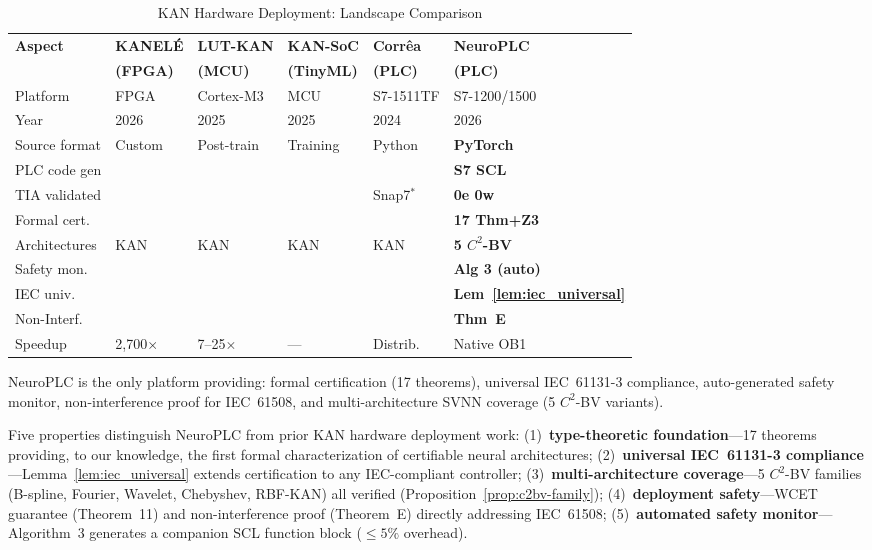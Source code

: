 \documentclass[journal,onecolumn]{IEEEtran}
\newcommand{\neuroplc}{NeuroPLC\xspace}
\newcommand{\xmark}{\ding{55}}
\begin{document}
\begin{table}[tb]
\centering
\caption{KAN Hardware Deployment: Landscape Comparison}
\label{tab:kan_deployment}
\footnotesize
\begin{tabular}{@{}p{1.5cm}p{1.2cm}p{1.2cm}p{1.2cm}p{1.3cm}p{1.4cm}@{}}
\toprule
\textbf{Aspect} & \textbf{KANEL\'{E}} & \textbf{LUT-KAN} & \textbf{KAN-SoC} & \textbf{Corr\^ea} & \textbf{NeuroPLC} \\
 & \textbf{(FPGA)} & \textbf{(MCU)} & \textbf{(TinyML)} & \textbf{(PLC)} & \textbf{(PLC)} \\
\midrule
Platform & FPGA & Cortex-M3 & MCU & S7-1511TF & S7-1200/1500 \\
Year & 2026 & 2025 & 2025 & 2024 & 2026 \\
\midrule
Source format & Custom & Post-train & Training & Python & \textbf{PyTorch} \\
PLC code gen & \xmark & \xmark & \xmark & \xmark & \textbf{S7 SCL} \\
TIA validated & \xmark & \xmark & \xmark & Snap7$^{*}$ & \textbf{0e 0w} \\
Formal cert. & \xmark & \xmark & \xmark & \xmark & \textbf{17 Thm+Z3} \\
Architectures & KAN & KAN & KAN & KAN & \textbf{5 $C^2$-BV} \\
Safety mon. & \xmark & \xmark & \xmark & \xmark & \textbf{Alg 3 (auto)} \\
IEC univ. & \xmark & \xmark & \xmark & \xmark & \textbf{Lem~\ref{lem:iec_universal}} \\
Non-Interf.& \xmark & \xmark & \xmark & \xmark & \textbf{Thm~E} \\
Speedup & 2{,}700$\times$ & 7--25$\times$ & --- & Distrib. & Native OB1 \\
\bottomrule
\end{tabular}
\vspace{2pt}
{\scriptsize NeuroPLC is the only platform providing: formal certification (17 theorems),
universal IEC~61131-3 compliance, auto-generated safety monitor, non-interference proof
for IEC~61508, and multi-architecture SVNN coverage (5 $C^2$-BV variants).}
\end{table}

Five properties distinguish \neuroplc from prior KAN hardware deployment work:
(1)~\textbf{type-theoretic foundation}---17 theorems providing, to our knowledge, the first formal
characterization of certifiable neural architectures;
(2)~\textbf{universal IEC~61131-3 compliance}---Lemma~\ref{lem:iec_universal}
extends certification to any IEC-compliant controller;
(3)~\textbf{multi-architecture coverage}---5 $C^2$-BV families
(B-spline, Fourier, Wavelet, Chebyshev, RBF-KAN) all verified
(Proposition~\ref{prop:c2bv-family});
(4)~\textbf{deployment safety}---WCET guarantee (Theorem~11) and
non-interference proof (Theorem~E) directly addressing IEC~61508;
(5)~\textbf{automated safety monitor}---Algorithm~3 generates a
companion SCL function block ($\leq 5\%$ overhead).
\end{document}
